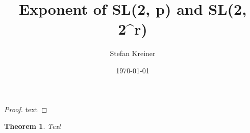 \documentclass[a4paper,10pt]{article}
\title{Exponent of SL(2, p) and SL(2, 2^r)}
\author{Stefan Kreiner}
\date{\today}
\begin{document}
\begin{proof}
text 
\end{proof}

\newtheorem{thm}{Theorem}

\begin{thm}
Text
\end{thm}
\end{document}
